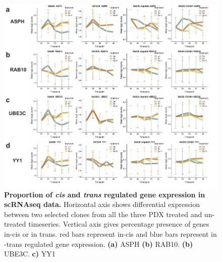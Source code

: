 \begin{figure}
\centering
  \includegraphics[width=\textwidth]{Figures/commongenesfromvolcanoplots.pdf}
	
\caption[Proportion of \textit{in-cis} and \textit{in-trans} regulated gene expression in scRNAseq data]
	{\small
	\textbf{Proportion of \textit{cis} and \textit{trans} regulated gene expression in scRNAseq data.}
	   Horizontal axis shows differential expression between two selected clones from all the three PDX treated and un-treated timeseries. Vertical axis gives percentage presence of genes in-cis or in trans. red bars represent in-cis and blue bars represent in -trans regulated gene expression.
	   \textbf{(a)} ASPH
	    \textbf{(b)} RAB10.
	    \textbf{(b)} UBE3C.
	     \textbf{c)} YY1
	}
	\label{fig:commongenesfromvolcanoplots}
\end{figure}


